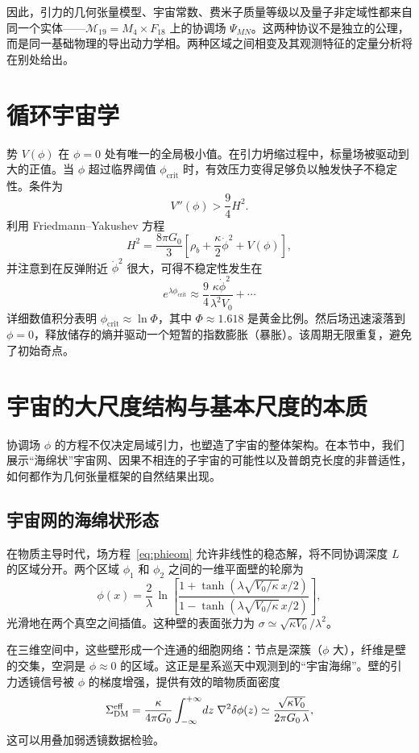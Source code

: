 \documentclass[12pt,a4paper]{article}
\begin{document}
	因此，引力的几何张量模型、宇宙常数、费米子质量等级以及量子非定域性都来自同一个实体——\(\mathcal{M}_{19}=M_4\times F_{18}\) 上的协调场 \(\Psi_{MN}\)。这两种协议不是独立的公理，而是同一基础物理的导出动力学相。两种区域之间相变及其观测特征的定量分析将在别处给出。
	
	\section{循环宇宙学}
	
	势 \(V(\phi)\) 在 \(\phi=0\) 处有唯一的全局极小值。在引力坍缩过程中，标量场被驱动到大的正值。当 \(\phi\) 超过临界阈值 \(\phi_{\mathrm{crit}}\) 时，有效压力变得足够负以触发快子不稳定性。条件为
	\[
	V''(\phi) > \frac{9}{4} H^2.
	\]
	利用 Friedmann–Yakushev 方程
	\[
	H^2 = \frac{8\pi G_0}{3} \left[ \rho_b + \frac{\kappa}{2}\dot\phi^2 + V(\phi) \right],
	\]
	并注意到在反弹附近 \(\dot\phi^2\) 很大，可得不稳定性发生在
	\[
	e^{\lambda\phi_{\mathrm{crit}}} \approx \frac{9}{4} \frac{\kappa\dot\phi^2}{\lambda^2 V_0} + \cdots
	\]
	详细数值积分表明 \(\phi_{\mathrm{crit}} \approx \ln\Phi\)，其中 \(\Phi \approx 1.618\) 是黄金比例。然后场迅速滚落到 \(\phi=0\)，释放储存的熵并驱动一个短暂的指数膨胀（暴胀）。该周期无限重复，避免了初始奇点。
	
	\section{宇宙的大尺度结构与基本尺度的本质}
	\label{sec:sponge}
	
	协调场 \(\phi\) 的方程不仅决定局域引力，也塑造了宇宙的整体架构。在本节中，我们展示“海绵状”宇宙网、因果不相连的子宇宙的可能性以及普朗克长度的非普适性，如何都作为几何张量框架的自然结果出现。
	
	\subsection{宇宙网的海绵状形态}
	在物质主导时代，场方程~\eqref{eq:phieom} 允许非线性的稳态解，将不同协调深度 \(L\) 的区域分开。两个区域 \(\phi_1\) 和 \(\phi_2\) 之间的一维平面壁的轮廓为
	\begin{equation}
		\phi(x) = \frac{2}{\lambda}\,\ln\!\left[
		\frac{1 + \tanh(\lambda\sqrt{V_0/\kappa}\, x/2)}
		{1 - \tanh(\lambda\sqrt{V_0/\kappa}\, x/2)}
		\right],
		\label{eq:domain-wall}
	\end{equation}
	光滑地在两个真空之间插值。这种壁的表面张力为 \(\sigma \simeq \sqrt{\kappa V_0}/\lambda^2\)。
	
	在三维空间中，这些壁形成一个连通的细胞网络：节点是深簇（\(\phi\) 大），纤维是壁的交集，空洞是 \(\phi \approx 0\) 的区域。这正是星系巡天中观测到的“宇宙海绵”。壁的引力透镜信号被 \(\phi\) 的梯度增强，提供有效的暗物质面密度
	\begin{equation}
		\Sigma_{\rm DM}^{\rm eff} = \frac{\kappa}{4\pi G_0} \int_{-\infty}^{+\infty} \!dz\; \nabla^2\delta\phi(z)
		\simeq \frac{\sqrt{\kappa V_0}}{2\pi G_0\,\lambda},
		\label{eq:wall-lensing}
	\end{equation}
	这可以用叠加弱透镜数据检验。
	
\end{document}
